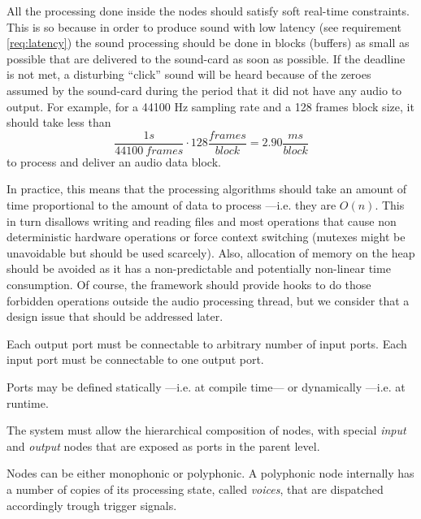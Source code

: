 \begin{mynote} \label{note:realtime} All the
  processing done inside the nodes should satisfy soft real-time
  constraints. This is so because in order to produce sound with low
  latency (see requirement \ref{req:latency}) the sound processing
  should be done in blocks (buffers) as small as possible that are
  delivered to the sound-card as soon as possible. If the deadline is
  not met, a disturbing ``click'' sound will be heard because of the
  zeroes assumed by the sound-card during the period that it did not
  have any audio to output. For example, for a 44100 Hz sampling rate
  and a 128 frames block size, it should take less than $$\frac{1
    s}{44100\ frames}\cdot128\frac{frames}{block}=2.90
  \frac{ms}{block}$$ to process and deliver an audio data block.

  In practice, this means that the processing algorithms should take
  an amount of time proportional to the amount of data to process
  ---i.e. they are $O(n)$. This in turn disallows writing and reading
  files and most operations that cause non deterministic hardware
  operations or force context switching (mutexes might be unavoidable
  but should be used scarcely). Also, allocation of memory on the
  heap should be avoided as it has a non-predictable and potentially
  non-linear time consumption. Of course, the framework should provide
  hooks to do those forbidden operations outside the audio processing
  thread, but we consider that a design issue that should be addressed
  later.
\end{mynote}

\begin{requirement}
Each output port must be connectable to arbitrary number of input
ports. Each input port must be connectable to one output port.
\end{requirement}

\begin{requirement}
Ports may be defined statically ---i.e. at compile time--- or
dynamically ---i.e. at runtime.
\end{requirement}

\begin{requirement}
The system must allow the hierarchical composition of nodes, with
special \emph{input} and \emph{output} nodes that are exposed as ports
in the parent level.
\end{requirement}

\begin{requirement}
\label{req:iter2-end}
Nodes can be either monophonic or polyphonic. A polyphonic node
internally has a number of copies of its processing state, called
\emph{voices}, that are dispatched accordingly trough trigger signals.
\end{requirement}

